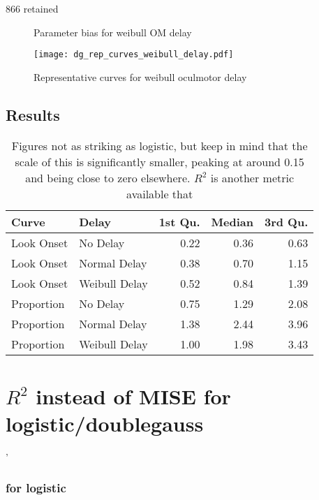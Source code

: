 866 retained

\begin{figure}[H]
\centering

\caption{Parameter bias for weibull OM delay}
\label{fig:dg_par_bias_weibull_delay}
\end{figure}

\begin{figure}[H]
\centering
\texttt{[image: dg\_rep\_curves\_weibull\_delay.pdf]}
\caption{Representative curves for weibull oculmotor delay}
\label{fig:dg_rep_curves_weibull_delay}
\end{figure}
\subsection{Results}

\begin{table}[ht]
\centering
\begin{tabular}{llrrr}
  \hline
Curve & Delay & 1st Qu. & Median & 3rd Qu. \\ 
  \hline
Look Onset & No Delay & 0.22 & 0.36 & 0.63 \\ 
  Look Onset & Normal Delay & 0.38 & 0.70 & 1.15 \\ 
  Look Onset & Weibull Delay & 0.52 & 0.84 & 1.39 \\ 
  Proportion & No Delay & 0.75 & 1.29 & 2.08 \\ 
  Proportion & Normal Delay & 1.38 & 2.44 & 3.96 \\ 
  Proportion & Weibull Delay & 1.00 & 1.98 & 3.43 \\ 
   \hline
\end{tabular}
\caption{Figures not as striking as logistic, but keep in mind that the scale of this is significantly smaller, peaking at around 0.15 and being close to zero elsewhere. $R^2$ is another metric available that }
\label{tab:dg_mise_sims}
\end{table}

\section*{$R^2$ instead of MISE for logistic/doublegauss}'



\subsubsection{for logistic}

